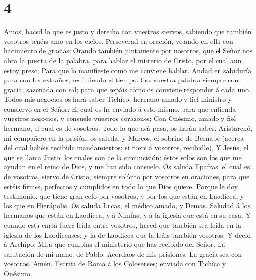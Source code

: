 \hypertarget{section-3}{%
\section{4}\label{section-3}}

 Amos, haced lo que es justo y derecho con vuestros
siervos, sabiendo que también vosotros tenéis amo en los cielos.
 Perseverad en oración, velando en ella con hacimiento de
gracias:  Orando también juntamente por nosotros, que el
Señor nos abra la puerta de la palabra, para hablar el misterio de
Cristo, por el cual aun estoy preso,  Para que lo
manifieste como me conviene hablar.  Andad en sabiduría
para con los extraños, redimiendo el tiempo.  Sea vuestra
palabra siempre con gracia, sazonada con sal; para que sepáis cómo os
conviene responder á cada uno.  Todos mis negocios os hará
saber Tichîco, hermano amado y fiel ministro y consiervo en el Señor:
 El cual os he enviado á esto mismo, para que entienda
vuestros negocios, y consuele vuestros corazones;  Con
Onésimo, amado y fiel hermano, el cual es de vosotros. Todo lo que acá
pasa, os harán saber.  Aristarchô, mi compañero en la
prisión, os saluda, y Marcos, el sobrino de Bernabé (acerca del cual
habéis recibido mandamientos; si fuere á vosotros, recibidle),
 Y Jesús, el que se llama Justo; los cuales son de la
circuncisión: éstos solos son los que me ayudan en el reino de Dios, y
me han sido consuelo.  Os saluda Epafras, el cual es de
vosotros, siervo de Cristo, siempre solícito por vosotros en oraciones,
para que estéis firmes, perfectos y cumplidos en todo lo que Dios
quiere.  Porque le doy testimonio, que tiene gran celo
por vosotros, y por los que están en Laodicea, y los que en Hierápolis.
 Os saluda Lucas, el médico amado, y Demas.
 Saludad á los hermanos que están en Laodicea, y á
Nimfas, y á la iglesia que está en su casa.  Y cuando
esta carta fuere leída entre vosotros, haced que también sea leída en la
iglesia de los Laodicenses; y la de Laodicea que la leáis también
vosotros.  Y decid á Archîpo: Mira que cumplas el
ministerio que has recibido del Señor.  La salutación de
mi mano, de Pablo. Acordaos de mis prisiones. La gracia sea con
vosotros. Amén. Escrita de Roma á los Colosenses; enviada con Tichîco y
Onésimo.

